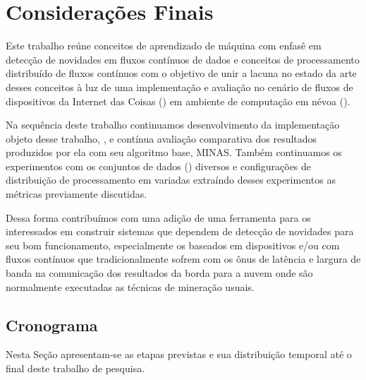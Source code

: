 \chapter{Considerações Finais}\label{cha:final}

Este trabalho reúne conceitos de aprendizado de máquina com enfasê em detecção
de novidades em fluxos contínuos de dados e conceitos de processamento
distribuído de fluxos contínuos com o objetivo de unir a lacuna no estado da
arte desses conceitos à luz de uma implementação e avaliação no cenário de
fluxos de dispositivos da Internet das Coisas (\iot) em ambiente de computação
em névoa (\fog).


Na sequência deste trabalho continuamos desenvolvimento da implementação objeto
desse trabalho, \mfog, e contínua avaliação comparativa dos resultados
produzidos por ela com seu algoritmo base, MINAS.
Também continuamos os experimentos com os conjuntos de dados (\datasets)
diversos e configurações de distribuição de processamento em \fog variadas
extraíndo desses experimentos as métricas previamente discutidas.


Dessa forma contribuímos com uma adição de uma ferramenta para os interessados
em construir sistemas que dependem de detecção de novidades para seu bom
funcionamento, especialmente os baseados em dispositivos \iot e/ou com fluxos
contínuos que tradicionalmente sofrem com os ônus de latência e largura de banda
na comunicação dos resultados da borda para a nuvem onde são normalmente
executadas as técnicas de mineração usuais.


\section{Cronograma}\label{sec:crono}

Nesta Seção apresentam-se as etapas previstas e sua distribuição temporal até o
final deste trabalho de pesquisa.

